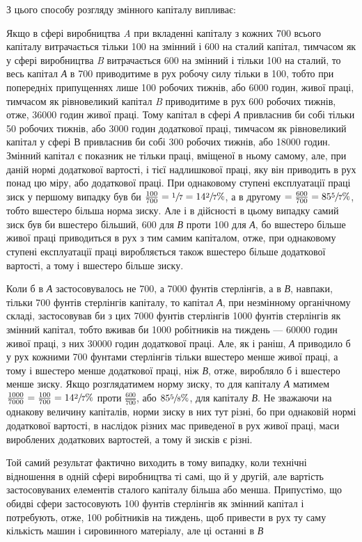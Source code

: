 
З цього способу розгляду змінного капіталу випливає:

Якщо в сфері виробництва \emph{A} при вкладенні капіталу з кожних 700 всього
капіталу витрачається тільки 100 на змінний
і 600 на сталий капітал, тимчасом як у сфері виробництва \emph{B}
витрачається 600 на змінний і тільки 100 на сталий, то весь
капітал \emph{А} в 700 приводитиме в рух робочу силу тільки в 100,
тобто при попередніх припущеннях лише 100 робочих тижнів,
або 6000 годин, живої праці, тимчасом як рівновеликий капітал \emph{B}
приводитиме в рух 600 робочих тижнів, отже, \num{36000} годин живої праці.
Тому капітал в сфері \emph{А} привласнив би собі тільки
50 робочих тижнів, або 3000 годин додаткової праці, тимчасом
як рівновеликий капітал у сфері В привласнив би собі 300 робочих тижнів,
або \num{18000} годин. Змінний капітал є показник не
тільки праці, вміщеної в ньому самому, але, при даній нормі
додаткової вартості, і тієї надлишкової праці, яку він приводить
в рух понад цю міру, або додаткової праці. При однаковому
ступені експлуатації праці зиск у першому випадку був би $\frac{100}{700} = \sfrac{1}{7} = 14\sfrac{2}{7}\%$, а
в другому $= \frac{600}{700} = 85\sfrac{5}{7}\%$, тобто вшестеро
більша норма зиску. Але і в дійсності в цьому випадку самий
зиск був би вшестеро більший, 600 для \emph{В} проти 100 для \emph{А}, бо
вшестеро більше живої праці приводиться в рух з тим самим
капіталом, отже, при однаковому ступені експлуатації праці
виробляється також вшестеро більше додаткової вартості, а тому
і вшестеро більше зиску.

Коли б в \emph{А} застосовувалось не 700, а 7000 фунтів стерлінгів, а
в \emph{В}, навпаки, тільки 700 фунтів стерлінгів капіталу, то
капітал \emph{А}, при незмінному органічному складі, застосовував би
з цих 7000 фунтів стерлінгів 1000 фунтів стерлінгів як змінний
капітал, тобто вживав би 1000 робітників на тиждень — \num{60000} годин живої праці,
з них \num{30000} годин додаткової праці. Але,
як і раніш, \emph{А} приводило б у рух кожними 700 фунтами стерлінгів тільки
вшестеро менше живої праці, а тому і вшестеро
менше додаткової праці, ніж \emph{В}, отже, виробляло б і вшестеро
менше зиску. Якщо розглядатимем норму зиску, то для капіталу \emph{А} матимем
$\frac{1000}{7000} = \frac{100}{700} = 14\sfrac{2}{7}\%$
проти $\frac{600}{700}$, або $85\sfrac{5}{8}\%$, для
капіталу \emph{В}. Не зважаючи на однакову величину капіталів, норми
зиску в них тут різні, бо при однаковій нормі додаткової
вартості, в наслідок різних мас приведеної в рух живої праці,
маси вироблених додаткових вартостей, а тому й зисків є різні.

Той самий результат фактично виходить в тому випадку, коли
технічні відношення в одній сфері виробництва ті самі, що й
у другій, але вартість застосовуваних елементів сталого капіталу більша або менша. Припустімо, що
обидві сфери застосовують 100 фунтів стерлінгів як змінний капітал і потребують, отже, 100
робітників на тиждень, щоб привести в рух ту саму
кількість машин і сировинного матеріалу, але ці останні в \emph{В}
\parbreak{}  %
